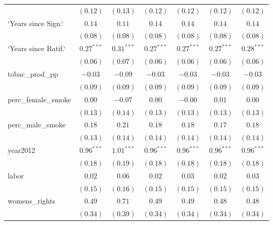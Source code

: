 \begin{table}[!h]
\begin{center}
\begin{tabular}{l c c c c c c }
                        & $(0.12)$     & $(0.13)$     & $(0.12)$     & $(0.12)$     & $(0.12)$     & $(0.12)$     \\
`Years since Sign.`     & $0.14$       & $0.11$       & $0.14$       & $0.14$       & $0.14$       & $0.14$       \\
                        & $(0.08)$     & $(0.08)$     & $(0.08)$     & $(0.08)$     & $(0.08)$     & $(0.08)$     \\
`Years since Ratif.`    & $0.27^{***}$ & $0.31^{***}$ & $0.27^{***}$ & $0.27^{***}$ & $0.27^{***}$ & $0.28^{***}$ \\
                        & $(0.06)$     & $(0.07)$     & $(0.06)$     & $(0.06)$     & $(0.06)$     & $(0.06)$     \\
tobac\_prod\_pp         & $-0.03$      & $-0.09$      & $-0.03$      & $-0.03$      & $-0.03$      & $-0.03$      \\
                        & $(0.09)$     & $(0.09)$     & $(0.09)$     & $(0.09)$     & $(0.09)$     & $(0.09)$     \\
perc\_female\_smoke     & $0.00$       & $-0.07$      & $0.00$       & $-0.00$      & $0.01$       & $0.00$       \\
                        & $(0.13)$     & $(0.14)$     & $(0.13)$     & $(0.13)$     & $(0.13)$     & $(0.13)$     \\
perc\_male\_smoke       & $0.18$       & $0.21$       & $0.18$       & $0.18$       & $0.17$       & $0.18$       \\
                        & $(0.13)$     & $(0.14)$     & $(0.14)$     & $(0.14)$     & $(0.14)$     & $(0.14)$     \\
year2012                & $0.96^{***}$ & $1.01^{***}$ & $0.96^{***}$ & $0.96^{***}$ & $0.96^{***}$ & $0.96^{***}$ \\
                        & $(0.18)$     & $(0.19)$     & $(0.18)$     & $(0.18)$     & $(0.18)$     & $(0.18)$     \\
labor                   & $0.02$       & $0.06$       & $0.02$       & $0.03$       & $0.02$       & $0.03$       \\
                        & $(0.15)$     & $(0.16)$     & $(0.15)$     & $(0.15)$     & $(0.15)$     & $(0.15)$     \\
womens\_rights          & $0.49$       & $0.71$       & $0.49$       & $0.49$       & $0.48$       & $0.48$       \\
                        & $(0.34)$     & $(0.39)$     & $(0.34)$     & $(0.34)$     & $(0.34)$     & $(0.34)$     \\

\end{tabular}
\end{center}
\end{table}
